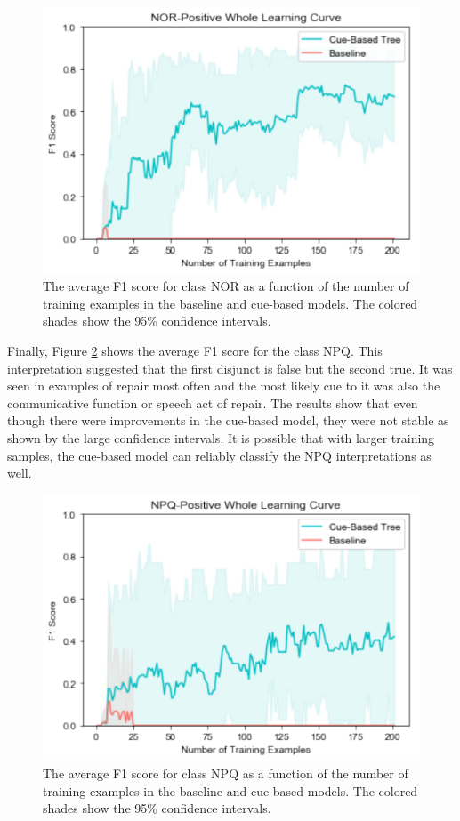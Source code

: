 \documentclass[,man,floatsintext]{apa6}
\begin{document}
\begin{figure}
\centering
\includegraphics{figs/NORWhole-1.pdf}
\caption{\label{fig:NORWhole}The average F1 score for class NOR as a function of the number of training examples in the baseline and cue-based models. The colored shades show the 95\% confidence intervals.}
\end{figure}

Finally, Figure \ref{fig:NPQWhole} shows the average F1 score for the class NPQ. This interpretation suggested that the first disjunct is false but the second true. It was seen in examples of repair most often and the most likely cue to it was also the communicative function or speech act of repair. The results show that even though there were improvements in the cue-based model, they were not stable as shown by the large confidence intervals. It is possible that with larger training samples, the cue-based model can reliably classify the NPQ interpretations as well.

\begin{figure}
\centering
\includegraphics{figs/NPQWhole-1.pdf}
\caption{\label{fig:NPQWhole}The average F1 score for class NPQ as a function of the number of training examples in the baseline and cue-based models. The colored shades show the 95\% confidence intervals.}
\end{figure}
\end{document}
